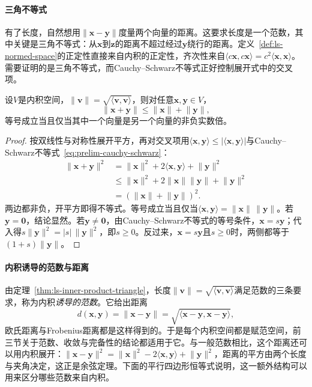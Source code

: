 \paragraph{三角不等式}
有了长度，自然想用$\lVert\bm x-\bm y\rVert$度量两个向量的距离。这要求长度是一个范数，其中关键是三角不等式：从$\bm x$到$\bm z$的距离不超过经过$\bm y$绕行的距离。定义~\ref{def:ls-normed-space}的正定性直接来自内积的正定性，齐次性来自$\langle c\bm x,c\bm x\rangle=c^2\langle\bm x,\bm x\rangle$。需要证明的是三角不等式，而Cauchy--Schwarz不等式正好控制展开式中的交叉项。
\begin{theorem}[内积诱导长度的三角不等式]
\label{thm:ls-inner-product-triangle}
设$V$是内积空间，$\lVert\bm v\rVert=\sqrt{\langle\bm v,\bm v\rangle}$，则对任意$\bm x,\bm y\in V$，
\[
 \lVert\bm x+\bm y\rVert\leq\lVert\bm x\rVert+\lVert\bm y\rVert,
\]
等号成立当且仅当其中一个向量是另一个向量的非负实数倍。
\end{theorem}
\begin{proof}
按双线性与对称性展开平方，再对交叉项用$\langle\bm x,\bm y\rangle\leq|\langle\bm x,\bm y\rangle|$与Cauchy--Schwarz不等式~\eqref{eq:prelim-cauchy-schwarz}：
\[
 \begin{aligned}
 \lVert\bm x+\bm y\rVert^2
 &=\lVert\bm x\rVert^2+2\langle\bm x,\bm y\rangle+\lVert\bm y\rVert^2\\
 &\leq\lVert\bm x\rVert^2+2\lVert\bm x\rVert\lVert\bm y\rVert+\lVert\bm y\rVert^2\\
 &=(\lVert\bm x\rVert+\lVert\bm y\rVert)^2.
 \end{aligned}
\]
两边都非负，开平方即得不等式。等号成立当且仅当$\langle\bm x,\bm y\rangle=\lVert\bm x\rVert\,\lVert\bm y\rVert$。若$\bm y=\bm0$，结论显然。若$\bm y\neq\bm0$，由Cauchy--Schwarz不等式的等号条件，$\bm x=s\bm y$；代入得$s\lVert\bm y\rVert^2=|s|\,\lVert\bm y\rVert^2$，即$s\geq0$。反过来，$\bm x=s\bm y$且$s\geq0$时，两侧都等于$(1+s)\lVert\bm y\rVert$。
\end{proof}

\paragraph{内积诱导的范数与距离}
由定理~\ref{thm:ls-inner-product-triangle}，长度$\lVert\bm v\rVert=\sqrt{\langle\bm v,\bm v\rangle}$满足范数的三条要求，称为内积\emph{诱导的范数}。它给出距离
\[
 d(\bm x,\bm y)=\lVert\bm x-\bm y\rVert=\sqrt{\langle\bm x-\bm y,\bm x-\bm y\rangle},
\]
欧氏距离与Frobenius距离都是这样得到的。于是每个内积空间都是赋范空间，前三节关于范数、收敛与完备性的结论都适用于它。与一般范数相比，这个距离还可以用内积展开：$\lVert\bm x-\bm y\rVert^2=\lVert\bm x\rVert^2-2\langle\bm x,\bm y\rangle+\lVert\bm y\rVert^2$，距离的平方由两个长度与夹角决定，这正是余弦定理。下面的平行四边形恒等式说明，这一额外结构可以用来区分哪些范数来自内积。

